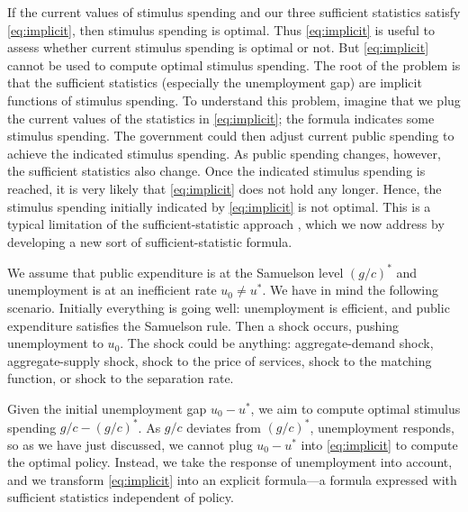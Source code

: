 \documentclass[letterpaper,12pt,leqno]{article}
\begin{document}
\begin{bibunit}
If the current values of stimulus spending and our three sufficient statistics satisfy \eqref{eq:implicit}, then stimulus spending is optimal. Thus \eqref{eq:implicit} is useful to assess whether current stimulus spending is optimal or not. But \eqref{eq:implicit} cannot be used to compute optimal stimulus spending. The root of the problem is that the sufficient statistics (especially the unemployment gap) are implicit functions of stimulus spending. To understand this problem, imagine that we plug the current values of the statistics in \eqref{eq:implicit}; the formula indicates some stimulus spending. The government could then adjust current public spending to achieve the indicated stimulus spending. As public spending changes, however, the sufficient statistics also change. Once the indicated stimulus spending is reached, it is very likely that \eqref{eq:implicit} does not hold any longer. Hence, the stimulus spending initially indicated by \eqref{eq:implicit} is not optimal. This is a typical limitation of the sufficient-statistic approach , which we now address by developing a new sort of sufficient-statistic formula.

We assume that public expenditure is at the Samuelson level $(g/c)^*$ and unemployment is at an inefficient rate $u_{0}\neq u^{*}$. We have in mind the following scenario. Initially everything is going well: unemployment is efficient, and public expenditure satisfies the Samuelson rule. Then a shock occurs, pushing unemployment to $u_0$. The shock could be anything: aggregate-demand shock, aggregate-supply shock, shock to the price of services, shock to the matching function, or shock to the separation rate.

Given the initial unemployment gap $u_0-u^*$, we aim to compute optimal stimulus spending $g/c - (g/c)^*$. As $g/c$ deviates from $(g/c)^*$, unemployment responds, so as we have just discussed, we cannot plug $u_0-u^*$ into \eqref{eq:implicit} to compute the optimal policy. Instead, we take the response of unemployment into account, and we transform \eqref{eq:implicit} into an explicit formula---a formula expressed with sufficient statistics independent of policy.


\end{bibunit}
\end{document}
